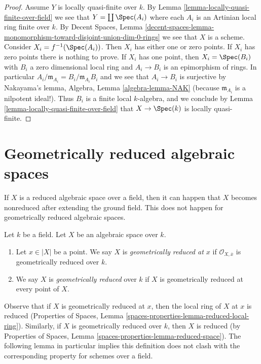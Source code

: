 \begin{proof}
Assume $Y$ is locally quasi-finite over $k$. By
Lemma \ref{lemma-locally-quasi-finite-over-field}
we see that $Y = \coprod \Spec(A_i)$ where each $A_i$ is an
Artinian local ring finite over $k$. By
Decent Spaces, Lemma
\ref{decent-spaces-lemma-monomorphism-toward-disjoint-union-dim-0-rings}
we see that $X$ is a scheme. Consider $X_i = f^{-1}(\Spec(A_i))$.
Then $X_i$ has either one or zero points. If $X_i$ has zero points there
is nothing to prove. If $X_i$ has one point, then
$X_i = \Spec(B_i)$ with $B_i$ a zero dimensional local ring
and $A_i \to B_i$ is an epimorphism of rings. In particular
$A_i/\mathfrak m_{A_i} = B_i/\mathfrak m_{A_i}B_i$ and we see that
$A_i \to B_i$ is surjective by Nakayama's lemma,
Algebra, Lemma \ref{algebra-lemma-NAK}
(because $\mathfrak m_{A_i}$ is a nilpotent ideal!).
Thus $B_i$ is a finite local $k$-algebra, and we conclude by
Lemma \ref{lemma-locally-quasi-finite-over-field}
that $X \to \Spec(k)$ is locally quasi-finite.
\end{proof}











\section{Geometrically reduced algebraic spaces}
\label{section-geometrically-reduced}

\noindent
If $X$ is a reduced algebraic space over a field, then it can happen that $X$
becomes nonreduced after extending the ground field. This does not happen
for geometrically reduced algebraic spaces.

\begin{definition}
\label{definition-geometrically-reduced}
Let $k$ be a field.
Let $X$ be an algebraic space over $k$.
\begin{enumerate}
\item Let $x \in |X|$ be a point. We say $X$ is
{\it geometrically reduced at $x$} if $\mathcal{O}_{X, \overline{x}}$
is geometrically reduced over $k$.
\item We say $X$ is {\it geometrically reduced} over $k$
if $X$ is geometrically reduced at every point of $X$.
\end{enumerate}
\end{definition}

\noindent
Observe that if $X$ is geometrically reduced at $x$, then the local
ring of $X$ at $x$ is reduced (Properties of Spaces, Lemma
\ref{spaces-properties-lemma-reduced-local-ring}).
Similarly, if $X$ is geometrically reduced over $k$, then $X$ is reduced
(by Properties of Spaces, Lemma \ref{spaces-properties-lemma-reduced-space}).
The following lemma in particular implies this definition does not clash
with the corresponding property for schemes over a field.

